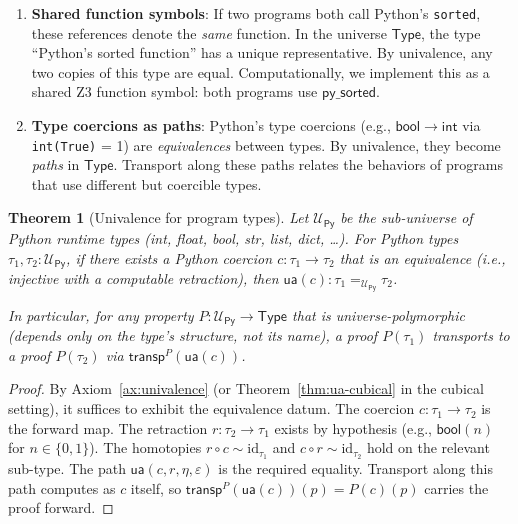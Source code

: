 \documentclass[11pt,a4paper]{report}
\theoremstyle{definition}
\theoremstyle{plain}
\newtheorem{theorem}[definition]{Theorem}
\newcommand{\Type}{\mathsf{Type}}
\newcommand{\transp}{\mathsf{transp}}
\begin{document}
\begin{enumerate}
  \item \textbf{Shared function symbols}: If two programs both call
    Python's \texttt{sorted}, these references denote the \emph{same}
    function.  In the universe $\Type$, the type ``Python's sorted
    function'' has a unique representative.  By univalence, any two
    copies of this type are equal.  Computationally, we implement this
    as a shared Z3 function symbol: both programs use
    $\mathsf{py\_sorted}$.

  \item \textbf{Type coercions as paths}: Python's type coercions
    (e.g., $\mathsf{bool} \to \mathsf{int}$ via \texttt{int(True)} = 1)
    are \emph{equivalences} between types.  By univalence, they become
    \emph{paths} in $\Type$.  Transport along these paths relates
    the behaviors of programs that use different but coercible types.
\end{enumerate}

\begin{theorem}[Univalence for program types]
\label{thm:ua-prog}
Let $\mathcal{U}_{\mathsf{Py}}$ be the sub-universe of Python runtime
types (int, float, bool, str, list, dict, \ldots).  For Python types
$\tau_1, \tau_2 : \mathcal{U}_{\mathsf{Py}}$, if there exists a
Python coercion $c : \tau_1 \to \tau_2$ that is an equivalence
(i.e., injective with a computable retraction), then
$\mathsf{ua}(c) : \tau_1 =_{\mathcal{U}_{\mathsf{Py}}} \tau_2$.

In particular, for any property $P : \mathcal{U}_{\mathsf{Py}} \to \Type$
that is \emph{universe-polymorphic} (depends only on the type's
structure, not its name), a proof $P(\tau_1)$ transports to a proof
$P(\tau_2)$ via $\transp^P(\mathsf{ua}(c))$.
\end{theorem}

\begin{proof}
By Axiom~\ref{ax:univalence} (or Theorem~\ref{thm:ua-cubical} in the
cubical setting), it suffices to exhibit the equivalence datum.
The coercion $c : \tau_1 \to \tau_2$ is the forward map.
The retraction $r : \tau_2 \to \tau_1$ exists by hypothesis (e.g.,
$\mathsf{bool}(n)$ for $n \in \{0,1\}$).  The homotopies
$r \circ c \sim \mathrm{id}_{\tau_1}$ and
$c \circ r \sim \mathrm{id}_{\tau_2}$ hold on the relevant
sub-type.  The path $\mathsf{ua}(c, r, \eta, \varepsilon)$ is the
required equality.  Transport along this path computes as $c$ itself,
so $\transp^P(\mathsf{ua}(c))(p) = P(c)(p)$ carries the proof forward.
\end{proof}
\end{document}
